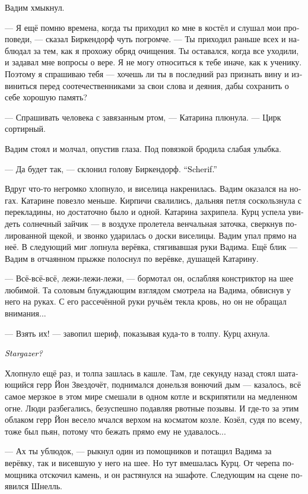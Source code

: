 \documentclass[a4paper,12pt,fleqn]{book}\usepackage{cooltooltips}\usepackage{polyglossia}\setdefaultlanguage[babelshorthands=true]{russian}\setotherlanguage{english}\defaultfontfeatures{Ligatures=TeX,Mapping=tex-text} \usepackage{xcolor}\definecolor{lightgray}{HTML}{bbbbbb}\color{lightgray}\newcommand{\ml}[3]{\textenglish{\textcolor{black}{#3}}}
\newcommand{\textspace}{\vspace{1em}{\centering\Large\bfseries<...>\par}\vspace{1em}}
\begin{document}
Вадим хмыкнул.

--- Я ещё помню времена, когда ты приходил ко мне в костёл и слушал мои проповеди, --- сказал Биркендорф чуть погромче.
--- Ты приходил раньше всех и наблюдал за тем, как я прохожу обряд очищения.
Ты оставался, когда все уходили, и задавал мне вопросы о вере.
Я не могу относиться к тебе иначе, как к ученику.
Поэтому я спрашиваю тебя --- хочешь ли ты в последний раз признать вину и извиниться перед соотечественниками за свои слова и деяния, дабы сохранить о себе хорошую память?

--- Спрашивать человека с завязанным ртом, --- Катарина плюнула.
--- Цирк сортирный.

Вадим стоял и молчал, опустив глаза.
Под повязкой бродила слабая улыбка.

--- Да будет так, --- склонил голову Биркендорф.
\ml{$0$}
{--- Шериф.}
{``Scherif.''}

\textspace

Вдруг что-то негромко хлопнуло, и виселица накренилась.
Вадим оказался на ногах.
Катарине повезло меньше.
Кирпичи свалились, дальняя петля соскользнула с перекладины, но достаточно было и одной.
Катарина захрипела.
Курц успела увидеть солнечный зайчик --- в воздухе пролетела венчальная заточка, сверкнув полированной щекой, и звонко ударилась о доски виселицы.
Вадим упал прямо на неё.
В следующий миг лопнула верёвка, стягивавшая руки Вадима.
Ещё блик --- Вадим в отчаянном прыжке полоснул по верёвке, душащей Катарину.

--- Всё-всё-всё, лежи-лежи-лежи, --- бормотал он, ослабляя констриктор на шее любимой.
Та соловым блуждающим взглядом смотрела на Вадима, обвиснув у него на руках.
С его рассечённой руки ручьём текла кровь, но он не обращал внимания...

--- Взять их! --- завопил шериф, показывая куда-то в толпу.
Курц ахнула.

\ml{$0$}
{<<Звездочёт?!>>}
{\textit{Stargazer?}}

Хлопнуло ещё раз, и толпа зашлась в кашле.
Там, где секунду назад стоял шатающийся герр Йон Звездочёт, поднимался донельзя вонючий дым --- казалось, всё самое мерзкое в этом мире смешали в одном котле и вскрипятили на медленном огне.
Люди разбегались, безуспешно подавляя рвотные позывы.
И где-то за этим облаком герр Йон весело мчался верхом на косматом козле.
Козёл, судя по всему, тоже был пьян, потому что бежать прямо ему не удавалось...

--- Ах ты ублюдок, --- рыкнул один из помощников и потащил Вадима за верёвку, так и висевшую у него на шее.
Но тут вмешалась Курц.
От черепа помощника отскочил камень, и он растянулся на эшафоте.
Следующим на сцене появился Шнелль.
\end{document}
